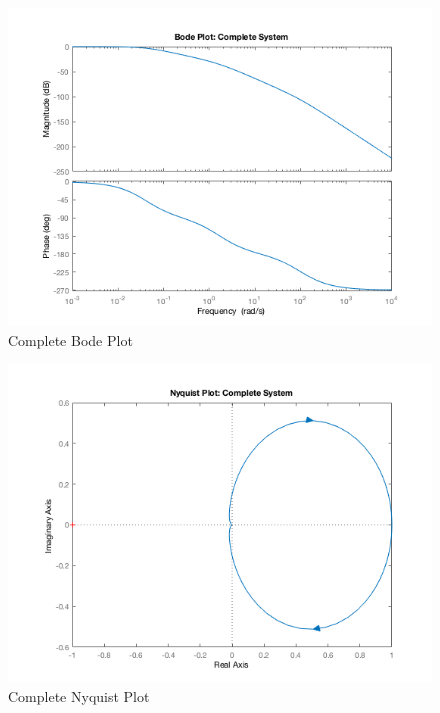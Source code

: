 \documentclass[12pt]{article}
\begin{document}
\begin{figure}[H]
\begin{center}
	\includegraphics[width=\textwidth]{./img/CompleteBode.png}
	\caption{\label{fig:completebode}Complete Bode Plot}
\end{center}
\end{figure}

\begin{figure}[H]
\begin{center}
	\includegraphics[width=\textwidth]{./img/CompleteNyquist.png}
	\caption{\label{fig:completenyquist}Complete Nyquist Plot}
\end{center}
\end{figure}
\end{document}

